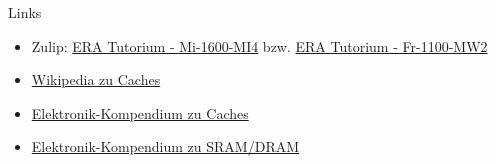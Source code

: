 \documentclass[
  german,            %
  aspectratio=169,    %
]{tumbeamer}
\begin{document}
\begin{frame}[fragile, c]{Links}{}
  \begin{itemize}
    \item Zulip: \href{https://zulip.in.tum.de/#narrow/stream/1917-ERA-Tutorium---Mi-1600-MI4}{\glqq ERA Tutorium - Mi-1600-MI4\grqq}
          bzw. \href{https://zulip.in.tum.de/#narrow/stream/1940-ERA-Tutorium---Fr-1100-MW2}{\glqq ERA Tutorium - Fr-1100-MW2\grqq}
    \item \href{https://en.wikipedia.org/wiki/Cache_placement_policies}{Wikipedia zu Caches}
    \item \href{https://www.elektronik-kompendium.de/sites/com/0309291.htm}{Elektronik-Kompendium zu Caches}
    \item \href{https://www.elektronik-kompendium.de/sites/com/0309191.htm}{Elektronik-Kompendium zu SRAM/DRAM}
  \end{itemize}
\end{frame}

\maketitle
\end{document}
